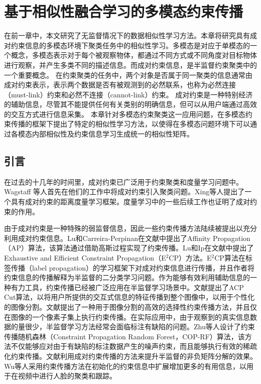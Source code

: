 \chapter{基于相似性融合学习的多模态约束传播}
在前一章中，本文研究了无监督情况下的数据相似性学习方法。本章将研究具有成对约束信息的多模态环境下聚类任务中的相似性学习。多模态是对应于单模态的一个概念，多模态表示对于每个被观察物体，都通过不同方式或不同角度对目标物体进行观察，并产生多类不同的描述信息。而成对约束信息，是半监督约束聚类中的一个重要概念。
在约束聚类的任务中，两个对象是否属于同一聚类的信息通常由成对约束表示，表示两个数据是否有被观测到的必然联系，也称为必然连接（must-link）约束和必然不连接（cannot-link）约束。 成对约束是一种特别经济的辅助信息，尽管其不能提供任何有关类别的明确信息，但可以从用户端通过高效的交互方式进行信息采集。
本章针对多模态约束聚类这一应用问题，在多模态约束传播的框架下提出了特定的相似性学习方法，以使得在多模态问题环境下可以通过各模态内部相似性及约束信息学习生成统一的相似性矩阵。

\section{引言}
\label{sec3:intro} 
在过去的十几年的时间里，成对约束已广泛用于约束聚类和度量学习问题中。Wagstaff 等人首先在他们的工作中将成对约束引入聚类问题\cite{wagstaff2000clustering,wagstaff2001constrained}。Xing等人提出了一个具有成对约束的距离度量学习框架\cite{xing2002distance}。度量学习中的一些后续工作也证明了成对约束的作用\cite{weinberger2005distance,davis2007information}。

由于成对约束是一种特殊的弱监督信息，因此一些约束传播方法\cite{lu2008constrained,lu2010constrained,fu2011symmetric}陆续被提出以充分利用成对约束信息。Lu和Carreira-Perpinan在文献\parencite{lu2008constrained}中提出了Affinity Propagation（AP）算法，该算法通过借助高斯过程实现了约束传播。Lu和Ip在文献\parencite{lu2010constrained}中提出了Exhaustive and Efficient Constraint Propagation（E$^2$CP）方法。E$^2$CP算法在标签传播（label propagation）\cite{zhou2004learning}的学习框架下对成对约束信息进行传播，并且作者将约束信息的传播解释为半监督的二分类学习问题。作为能够有效利用辅助信息的一种有力工具，约束传播已经被广泛应用在半监督学习场景中。文献\parencite{jian2016interactive}提出了ACP Cut算法，以将用户所提供的交互式信息的特征传播到整个图像中，以用于个性化的图像分割。文献\parencite{han2016segmentation}提出了一种用于图像分割的高效的选择性约束传播方法，并且仅在图像的一个像素子集上执行约束传播。在实际应用中，由于观察到的真实信息数据的量很少，半监督学习方法经常会面临标注有缺陷的问题。Zhu等人设计了约束传播随机森林（Constraint Propagation Random Forest，COP-RF）算法\cite {zhu2016constrained}，该方法不仅能够应对由于有缺陷的标注数据产生的噪声约束，而且能够执行有效的稀疏化约束传播。文献\parencite{wang2016semi}利用成对约束传播的方法来提升半监督的非负矩阵分解的效果。Wu等人采用约束传播方法在初始化的约束信息中扩展增加更多的有用信息，以用于在视频中进行人脸的聚类和跟踪\cite{wu2017coupled}。


